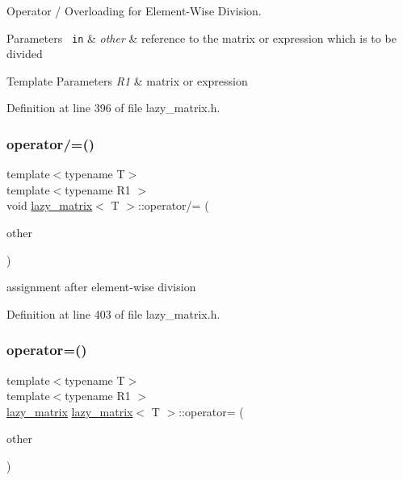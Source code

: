 Operator / Overloading for Element-\/\+Wise Division. 


\begin{DoxyParams}[1]{Parameters}
\mbox{\texttt{ in}}  & {\em other} & reference to the matrix or expression which is to be divided\\
\hline
\end{DoxyParams}

\begin{DoxyTemplParams}{Template Parameters}
{\em R1} & matrix or expression \\
\hline
\end{DoxyTemplParams}


Definition at line 396 of file lazy\+\_\+matrix.\+h.

\mbox{\label{classlazy__matrix_aa19e114755a98ae28c55cc07e06a3f1e}} 
\subsubsection{\texorpdfstring{operator/=()}{operator/=()}}
{\footnotesize\ttfamily template$<$typename T$>$ \\
template$<$typename R1 $>$ \\
void \mbox{\hyperlink{classlazy__matrix}{lazy\+\_\+matrix}}$<$ T $>$\+::operator/= (\begin{DoxyParamCaption}\item[{const R1 \&}]{other }\end{DoxyParamCaption})\hspace{0.3cm}{\ttfamily [inline]}}



assignment after element-\/wise division 



Definition at line 403 of file lazy\+\_\+matrix.\+h.

\mbox{\label{classlazy__matrix_a3104aa043b2a46f335aa697834634b7a}} 
\subsubsection{\texorpdfstring{operator=()}{operator=()}}
{\footnotesize\ttfamily template$<$typename T$>$ \\
template$<$typename R1 $>$ \\
\mbox{\hyperlink{classlazy__matrix}{lazy\+\_\+matrix}} \mbox{\hyperlink{classlazy__matrix}{lazy\+\_\+matrix}}$<$ T $>$\+::operator= (\begin{DoxyParamCaption}\item[{const R1 \&}]{other }\end{DoxyParamCaption})\hspace{0.3cm}{\ttfamily [inline]}}



